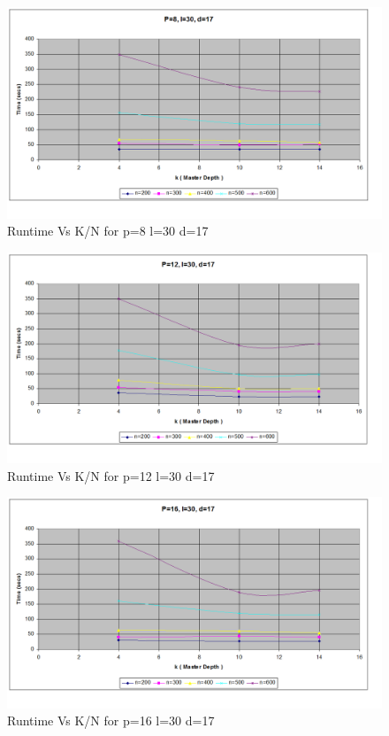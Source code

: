 \documentclass[twoside,11pt]{article}\usepackage{amsmath,amsfonts,amsthm,fullpage}
\begin{document}
\begin{figure}[!htbp]
\centering
\includegraphics[scale=.46]{images/pld_p=8-l=30-d=17} 
\caption{Runtime Vs K/N for p=8 l=30 d=17}
\label{K Vs N for p=8 l=30 d=17}
\end{figure}

\begin{figure}[!htbp]
\centering
\includegraphics[scale=.46]{images/pld_p=12-l=30-d=17} 
\caption{Runtime Vs K/N for p=12 l=30 d=17}
\label{K Vs N for p=12 l=30 d=17}
\end{figure}

\begin{figure}[!htbp]
\centering
\includegraphics[scale=.46]{images/pld_p=16-l=30-d=17} 
\caption{Runtime Vs K/N for p=16 l=30 d=17}
\label{K Vs N for p=16 l=30 d=17}
\end{figure}
\end{document}
